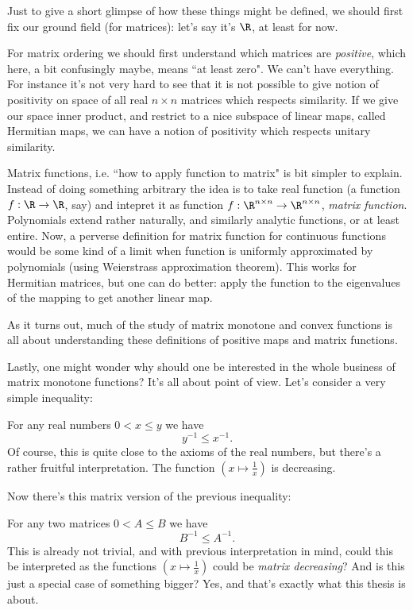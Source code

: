 Just to give a short glimpse of how these things might be defined, we should first fix our ground field (for matrices): let's say it's $\R$, at least for now.

For matrix ordering we should first understand which matrices are \textit{positive}, which here, a bit confusingly maybe, means ``at least zero". We can't have everything. For instance it's not very hard to see that it is not possible to give notion of positivity on space of all real $n \times n$ matrices which respects similarity. If we give our space inner product, and restrict to a nice subspace of linear maps, called Hermitian maps, we can have a notion of positivity which respects unitary similarity.

Matrix functions, i.e. ``how to apply function to matrix" is bit simpler to explain. Instead of doing something arbitrary the idea is to take real function (a function $f : \R \to \R$, say) and intepret it as function $f : \R^{n \times n} \to \R^{n \times n}$, \textit{matrix function}. Polynomials extend rather naturally, and similarly analytic functions, or at least entire. Now, a perverse definition for matrix function for continuous functions would be some kind of a limit when function is uniformly approximated by polynomials (using Weierstrass approximation theorem). This works for Hermitian matrices, but one can do better: apply the function to the eigenvalues of the mapping to get another linear map.

As it turns out, much of the study of matrix monotone and convex functions is all about understanding these definitions of positive maps and matrix functions.

Lastly, one might wonder why should one be interested in the whole business of matrix monotone functions? It's all about point of view. Let's consider a very simple inequality:

For any real numbers $0 < x \leq y$ we have
\[
	y^{-1} \leq x^{-1}.
\]
Of course, this is quite close to the axioms of the real numbers, but there's a rather fruitful interpretation. The function $(x \mapsto \frac{1}{x})$ is decreasing.

Now there's this matrix version of the previous inequality:

For any two matrices $0 < A \leq B$ we have
\[
	B^{-1} \leq A^{-1}.
\]
This is already not trivial, and with previous interpretation in mind, could this be interpreted as the functions $(x \mapsto \frac{1}{x})$ could be \textit{matrix decreasing}? And is this just a special case of something bigger? Yes, and that's exactly what this thesis is about.

